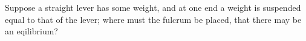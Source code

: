 Suppose a straight lever has some weight, and at one end 
a weight is suspended equal to that of the lever; 
where must the fulcrum be placed, 
that there may be an eqilibrium?
